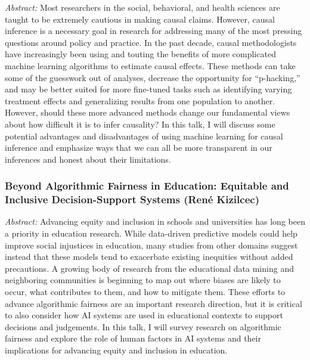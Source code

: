 \documentclass[letterpaper,11pt,oneside]{book} %
\begin{document}
\emph{Abstract:} Most researchers in the social, behavioral, and health
sciences are taught to be extremely cautious in making causal claims.
However, causal inference is a necessary goal in research for addressing
many of the most pressing questions around policy and practice. In the
past decade, causal methodologists have increasingly been using and
touting the benefits of more complicated machine learning algorithms to
estimate causal effects. These methods can take some of the guesswork
out of analyses, decrease the opportunity for ``p-hacking,'' and may be
better suited for more fine-tuned tasks such as identifying varying
treatment effects and generalizing results from one population to
another. However, should these more advanced methods change our
fundamental views about how difficult it is to infer causality? In this
talk, I will discuss some potential advantages and disadvantages of
using machine learning for causal inference and emphasize ways that we
can all be more transparent in our inferences and honest about their
limitations.

\hypertarget{beyond-algorithmic-fairness-in-education-equitable-and-inclusive-decision-support-systems-renuxe9-kizilcec}{%
\subsubsection{Beyond Algorithmic Fairness in Education: Equitable and
Inclusive Decision-Support Systems (René
Kizilcec)}\label{beyond-algorithmic-fairness-in-education-equitable-and-inclusive-decision-support-systems-renuxe9-kizilcec}}

\emph{Abstract:} Advancing equity and inclusion in schools and
universities has long been a priority in education research. While
data-driven predictive models could help improve social injustices in
education, many studies from other domains suggest instead that these
models tend to exacerbate existing inequities without added precautions.
A growing body of research from the educational data mining and
neighboring communities is beginning to map out where biases are likely
to occur, what contributes to them, and how to mitigate them. These
efforts to advance algorithmic fairness are an important research
direction, but it is critical to also consider how AI systems are used
in educational contexts to support decisions and judgements. In this
talk, I will survey research on algorithmic fairness and explore the
role of human factors in AI systems and their implications for advancing
equity and inclusion in education.
\end{document}
